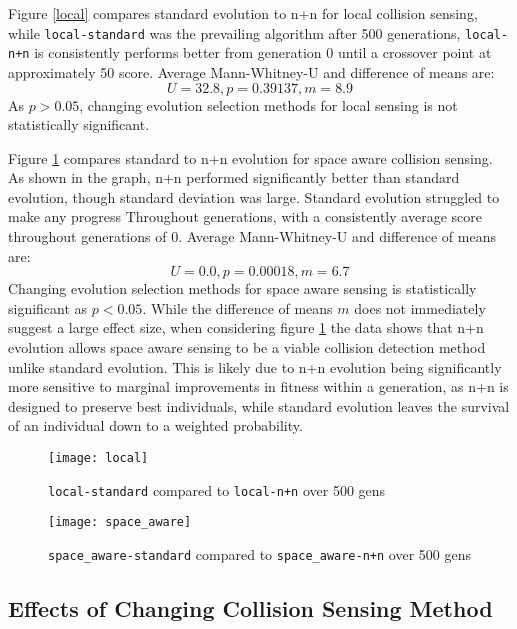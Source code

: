 Figure \ref{local} compares standard evolution to n+n for local collision sensing, while \verb|local-standard| was the prevailing algorithm after 500 generations, \verb|local-n+n| is consistently performs better from generation 0 until a crossover point at approximately 50 score. Average Mann-Whitney-U and difference of means are:
$$
U = 32.8, p = 0.39137, m = 8.9
$$
As $p > 0.05$, changing evolution selection methods for local sensing is not statistically significant.
\bigskip

Figure \ref{space_aware} compares standard to n+n evolution for space aware collision sensing. As shown in the graph, n+n performed significantly better than standard evolution, though standard deviation was large. Standard evolution struggled to make any progress Throughout generations, with a consistently average score throughout generations of 0. Average Mann-Whitney-U and difference of means are:
$$
U = 0.0, p = 0.00018, m = 6.7
$$
Changing evolution selection methods for space aware sensing is statistically significant as $p < 0.05$. While the difference of means $m$ does not immediately suggest a large effect size, when considering figure \ref{space_aware} the data shows that n+n evolution allows space aware sensing to be a viable collision detection method unlike standard evolution. This is likely due to n+n evolution being significantly more sensitive to marginal improvements in fitness within a generation, as n+n is designed to preserve best individuals, while standard evolution leaves the survival of an individual down to a weighted probability.

\begin{figure}[h]
  \centering
  \begin{minipage}{.5\textwidth}
    \centering
    \captionsetup{width=.8\linewidth}
    \texttt{[image: local]}
    \caption{\texttt{local-standard} compared to \texttt{local-n+n} over 500 gens}
    \label{local}
  \end{minipage}%
  \begin{minipage}{.5\textwidth}
    \centering
    \captionsetup{width=.8\linewidth}
    \texttt{[image: space\_aware]}
    \caption{\texttt{space\_aware-standard} compared to \texttt{space\_aware-n+n} over 500 gens}
    \label{space_aware}
  \end{minipage}
\end{figure}


\subsection{Effects of Changing Collision Sensing Method}

